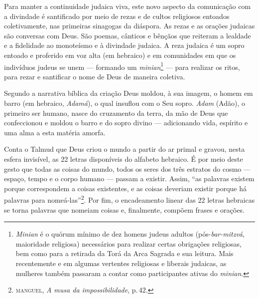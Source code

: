 Para manter a continuidade judaica viva, este novo aspecto da
comunicação com a divindade é santificado por meio de rezas e de cultos
religiosos entoados coletivamente, nas primeiras sinagogas da diáspora.
As rezas e as orações judaicas são conversas com Deus. São poemas,
cânticos e bênçãos que reiteram a lealdade e a fidelidade ao monoteísmo
e à divindade judaica. A reza judaica é um sopro entoado e proferido em
voz alta (em hebraico) e em comunidades em que os indivíduos judeus se
unem --- formando um \emph{minian}\footnote{\emph{Minian} é o quórum
  mínimo de dez homens judeus adultos (pós-\emph{bar-mitzvá}, maioridade
  religiosa) necessários para realizar certas obrigações religiosas, bem
  como para a retirada da Torá da Arca Sagrada e sua leitura.
  Mais recentemente e em algumas vertentes religiosas e liberais
  judaicas, as mulheres também passaram a contar como participantes
  ativas do \emph{minian}.} --- para realizar os ritos, para rezar e
santificar o nome de Deus de maneira coletiva.

Segundo a narrativa bíblica da criação Deus moldou, à sua imagem, o
homem em barro (em hebraico, \emph{Adamá}), o qual insuflou com o Seu
sopro. \emph{Adam} (Adão), o primeiro ser humano, nasce do cruzamento da
terra, da mão de Deus que confeccionou e moldou o barro e do sopro
divino --- adicionando vida, espírito e uma alma a esta matéria amorfa.

Conta o Talmud que Deus criou o mundo a partir do ar primal e
gravou, nesta esfera invisível, as 22 letras disponíveis do alfabeto
hebraico. É por meio deste gesto que todas as coisas do mundo, todos os
seres dos três estratos do cosmo --- espaço, tempo e o corpo humano ---
passam a existir. Assim, ``as palavras existem porque correspondem
a coisas existentes, e as coisas deveriam existir porque há palavras
para nomeá-las''\footnote{\textsc{manguel}, \emph{A musa da impossibilidade}, p.\,42.}. Por fim, o encadeamento linear das 22 letras hebraicas se torna
palavras que nomeiam coisas e, finalmente, compõem frases e orações.



